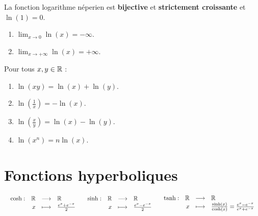 \begin{proposition}
	La fonction logarithme néperien est \textbf{bijective} et \textbf{strictement croissante} et $\ln(1) = 0$.
    \begin{enumerate}
            \item $\lim_{x \to 0} \ln(x) = -\infty$.
            \item $\lim_{x \to +\infty} \ln(x) = +\infty$.
        \end{enumerate}
    \noindent Pour tous $x, y \in \mathbb{R}$ :
    \begin{enumerate}
            \item $\ln(xy) = \ln(x) + \ln(y)$.
            \item $\ln(\frac{1}{x}) = -\ln(x)$.
            \item $\ln(\frac{x}{y}) = \ln(x) - \ln(y)$.
            \item $\ln(x^n) = n \ln(x)$.
        \end{enumerate}
\end{proposition}

\section{Fonctions hyperboliques}

\begin{definition}
	\begin{center}
		$
		\begin{array}{ccc}
			\begin{array}{rrcl} \cosh : & \mathbb{R} & \longrightarrow & \mathbb{R} \\ & x & \longmapsto & \frac{e^x + e^{-x}}{2} \end{array}
			&
			\begin{array}{rrcl} \sinh : & \mathbb{R} & \longrightarrow & \mathbb{R} \\ & x & \longmapsto & \frac{e^x - e^{-x}}{2} \end{array}
			&
			\begin{array}{rrcl} \tanh : & \mathbb{R} & \longrightarrow & \mathbb{R} \\ & x & \longmapsto & \frac{\sinh(x)}{\cosh(x)} = \frac{e^x - e^{-x}}{e^x + e^{-x}} \end{array}
		\end{array}
		$
	\end{center}
\end{definition}

